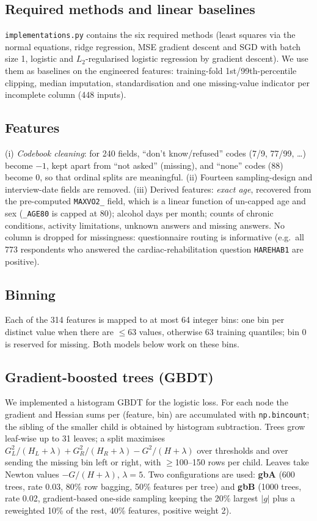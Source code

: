 \documentclass[10pt,conference,compsocconf]{IEEEtran}
\begin{document}
\subsection{Required methods and linear baselines}
\texttt{implementations.py} contains the six required methods (least squares via the normal
equations, ridge regression, MSE gradient descent and SGD with batch size 1, logistic and
$L_2$-regularised logistic regression by gradient descent). We use them as baselines on the
engineered features: training-fold 1st/99th-percentile clipping, median imputation,
standardisation and one missing-value indicator per incomplete column (448 inputs).

\subsection{Features}
(i) \emph{Codebook cleaning}: for 240 fields, ``don't know/refused'' codes (7/9, 77/99,
\dots) become $-1$, kept apart from ``not asked'' (missing), and ``none'' codes (88) become
0, so that ordinal splits are meaningful. (ii) Fourteen sampling-design and interview-date
fields are removed. (iii) Derived features: \emph{exact age}, recovered from the
pre-computed \texttt{MAXVO2\_} field, which is a linear function of un-capped age and sex
(\texttt{\_AGE80} is capped at 80); alcohol days per month; counts of chronic conditions,
activity limitations, unknown answers and missing answers. No column is dropped for
missingness: questionnaire routing is informative (e.g.\ all 773 respondents who answered
the cardiac-rehabilitation question \texttt{HAREHAB1} are positive).

\subsection{Binning}
Each of the 314 features is mapped to at most 64 integer bins: one bin per distinct value
when there are $\le 63$ values, otherwise 63 training quantiles; bin 0 is reserved for
missing. Both models below work on these bins.

\subsection{Gradient-boosted trees (GBDT)}
We implemented a histogram GBDT for the logistic loss. For each node the gradient and
Hessian sums per (feature, bin) are accumulated with \texttt{np.bincount}; the sibling of
the smaller child is obtained by histogram subtraction. Trees grow leaf-wise up to 31
leaves; a split maximises $G_L^2/(H_L+\lambda)+G_R^2/(H_R+\lambda)-G^2/(H+\lambda)$ over
thresholds and over sending the missing bin left or right, with $\ge$100--150 rows per
child. Leaves take Newton values $-G/(H+\lambda)$, $\lambda=5$. Two configurations are used:
\textbf{gbA} (600 trees, rate 0.03, 80\% row bagging, 50\% features per tree) and
\textbf{gbB} (1000 trees, rate 0.02, gradient-based one-side sampling keeping the 20\%
largest $|g|$ plus a reweighted 10\% of the rest, 40\% features, positive weight 2).
\end{document}
